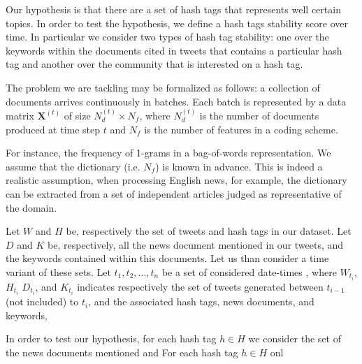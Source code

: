 

Our hypothesis is that there are a set of hash tags that represents well certain topics.
In order to test the hypothesis, we define a hash tags stability score over time. In particular
we consider two types of hash tag stability: one over the keywords within the documents cited in tweets that contains a particular hash tag and another over the community that is interested on a hash tag.  



The problem we are tackling may be formalized as follows: a collection of documents arrives continuously in batches. 
Each batch is represented by a data matrix $\mathbf{X}^{(t)}$ of size $N_d^{(t)} \times N_f$, where $N_d^{(t)}$ is the number of documents produced at time step $t$ and $N_f$ is the number of features in a coding scheme.

For instance, the frequency of 1-grams in a bag-of-words representation. We assume that the dictionary (i.e. $N_f$) is known in advance.  This is indeed a realistic assumption, when processing English news, for example, the dictionary can be extracted from a set of independent articles judged as representative of the domain.




Let $W$ and $H$ be, respectively the set of tweets and hash tags in our dataset.
Let $D$ and $K$ be, respectively, all the news document
mentioned in our tweets, and the keywords contained within this documents.
Let us than consider a time variant of these sets. Let $t_1, t_2, ..., t_n$ be a set of considered date-times , where $W_{t_i}$, $H_{t_i}$
$D_{t_i}$, and $K_{t_i}$ indicates respectively the set of tweets generated between $t_{i-1}$(not included) to $t_{i}$, 
and the associated hash tags, news documents, and keywords,

In order to test our hypothesis, for each hash tag $h \in H$ we consider the set of the news documents mentioned and  
For each hash tag $h \in H$ onl
\fi

